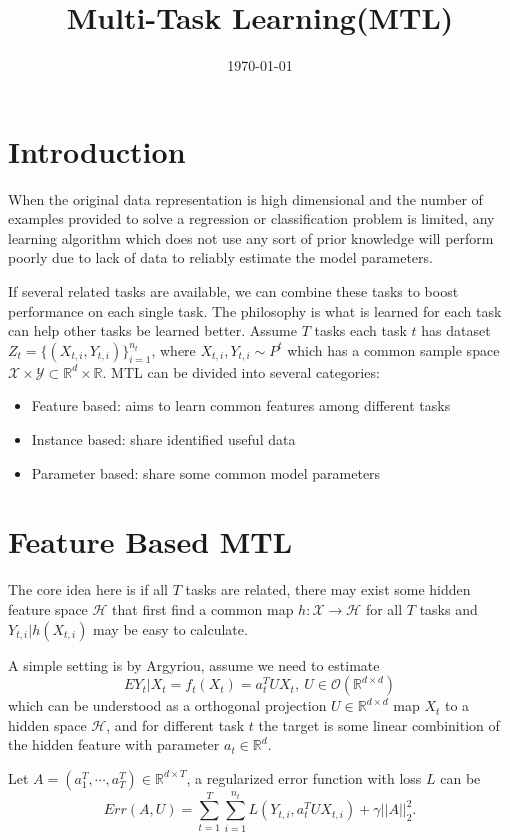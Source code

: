 \documentclass[12pt, a4paper, oneside]{article}
\title{\textbf{Multi-Task Learning(MTL)}}
\date{\today}
\begin{document}
\maketitle
\setcounter{page}{1}
\section{Introduction}
    When the original data representation is high dimensional and the number of examples provided to solve a regression or classification problem is limited, any learning algorithm which does not use any sort of prior knowledge will
    perform poorly due to lack of data to reliably estimate the model parameters.


    If several related tasks are available, we can combine these tasks to boost performance on each single task. The philosophy is what is learned for each task can help other tasks be learned better. Assume $T$ tasks each task $t$ has dataset $Z_t=\{(X_{t,i},Y_{t,i})\}_{i=1}^{n_t}$, where $X_{t,i},Y_{t,i}\sim P^t$ which has a common sample space $\mathcal{X}\times\mathcal{Y}\subset\mathbb{R}^d\times\mathbb{R}$. MTL can be divided into several categories:
    \begin{itemize}
        \item Feature based: aims to learn common features among different tasks
        \item Instance based: share identified useful data
        \item Parameter based: share some common model parameters
    \end{itemize}


\section{Feature Based MTL}
    The core idea here is if all $T$ tasks are related, there may exist some hidden feature space $\mathcal{H}$ that first find a common map $h:\mathcal{X}\rightarrow\mathcal{H}$ for all $T$ tasks and $Y_{t,i}|h(X_{t,i})$ may be easy to calculate.


    A simple setting is by Argyriou\cite{argyriou2008convex}, assume we need to estimate
    \begin{equation*}
        EY_t|X_t=f_t(X_t)=a_t^TUX_t,\ U\in\mathcal{O}(\mathbb{R}^{d\times d})
    \end{equation*}
    which can be understood as a orthogonal projection $U\in\mathbb{R}^{d\times d}$ map $X_t$ to a hidden space $\mathcal{H}$, and for different task $t$ the target is some linear combinition of the hidden feature with parameter $a_t\in\mathbb{R}^d$.


    Let $A=(a_1^T,\cdots,a_T^T)\in\mathbb{R}^{d\times T}$, a regularized error function with loss $L$ can be
    \begin{equation*}
        Err(A,U)=\overset{T}{\underset{t=1}\sum}\overset{n_t}{\underset{i=1}\sum}L(Y_{t,i},a_t^TUX_{t,i})+\gamma||A||_2^2.
    \end{equation*}
\newpage


\end{document}
